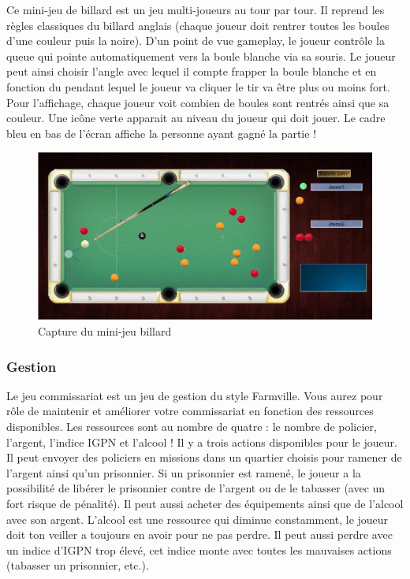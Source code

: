 Ce mini-jeu de billard est un jeu multi-joueurs au tour par tour. 
Il reprend les règles classiques du billard anglais (chaque joueur doit rentrer toutes les boules d’une couleur puis la noire). 
D’un point de vue gameplay, le joueur contrôle la queue qui pointe automatiquement vers la boule blanche via sa souris. 
Le joueur peut ainsi choisir l’angle avec lequel il compte frapper la boule blanche et en fonction du pendant lequel le joueur va cliquer le tir va être plus ou moins fort. 
Pour l’affichage, chaque joueur voit combien de boules sont rentrés ainsi que sa couleur. Une icône verte apparait au niveau du joueur qui doit jouer. 
Le cadre bleu en bas de l’écran affiche la personne ayant gagné la partie !

\begin{figure}
 \includegraphics[width=\linewidth]{img/capturejeu_billard}
 \caption{Capture du mini-jeu billard}
 \label{fig:game_billard}
\end{figure}

\subsubsection{Gestion}

Le jeu commissariat est  un jeu de gestion du style Farmville. 
Vous aurez pour rôle de maintenir et améliorer votre commissariat en fonction des ressources disponibles.
 Les ressources sont au nombre de quatre : le nombre de policier, l’argent, l’indice IGPN et l’alcool ! 
Il y a trois actions disponibles pour le joueur. Il peut envoyer des policiers en missions dans un quartier 
choisis pour ramener de l’argent ainsi qu’un prisonnier.  Si un prisonnier est ramené, le joueur a la possibilité 
de libérer le prisonnier contre de l’argent ou de le tabasser (avec un fort risque de pénalité). 
Il peut aussi acheter des équipements ainsi que de l’alcool avec son argent. L’alcool est une ressource qui diminue constamment, 
le joueur doit ton veiller a toujours en avoir pour ne pas perdre. Il peut aussi perdre avec un indice d’IGPN trop élevé, cet indice 
monte avec toutes les mauvaises actions (tabasser un prisonnier, etc.).

